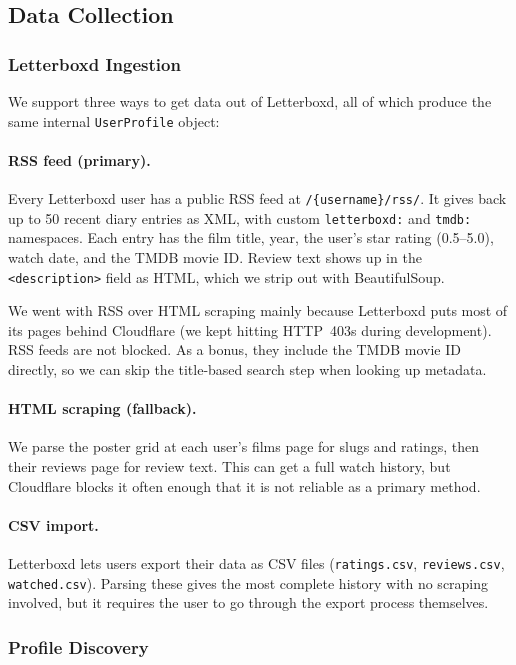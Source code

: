 \documentclass[sigconf,nonacm]{acmart}
\begin{document}
\subsection{Data Collection}

\subsubsection{Letterboxd Ingestion}

We support three ways to get data out of Letterboxd, all of which produce the same internal \texttt{UserProfile} object:

\paragraph{RSS feed (primary).}
Every Letterboxd user has a public RSS feed at \texttt{/\{username\}/rss/}. It gives back up to 50 recent diary entries as XML, with custom \texttt{letterboxd:} and \texttt{tmdb:} namespaces. Each entry has the film title, year, the user's star rating (0.5--5.0), watch date, and the TMDB movie ID. Review text shows up in the \texttt{<description>} field as HTML, which we strip out with BeautifulSoup.

We went with RSS over HTML scraping mainly because Letterboxd puts most of its pages behind Cloudflare (we kept hitting HTTP~403s during development). RSS feeds are not blocked. As a bonus, they include the TMDB movie ID directly, so we can skip the title-based search step when looking up metadata.

\paragraph{HTML scraping (fallback).}
We parse the poster grid at each user's films page for slugs and ratings, then their reviews page for review text. This can get a full watch history, but Cloudflare blocks it often enough that it is not reliable as a primary method.

\paragraph{CSV import.}
Letterboxd lets users export their data as CSV files (\texttt{ratings.csv}, \texttt{reviews.csv}, \texttt{watched.csv}). Parsing these gives the most complete history with no scraping involved, but it requires the user to go through the export process themselves.

\subsubsection{Profile Discovery}
\end{document}
